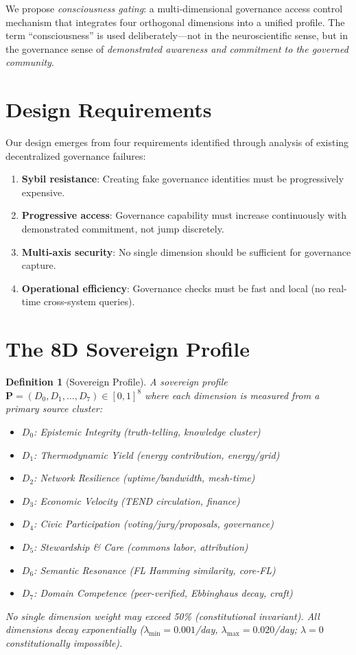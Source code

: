 \documentclass[11pt,twocolumn]{article}
\newtheorem{definition}{Definition}
\begin{document}
We propose \emph{consciousness gating}: a multi-dimensional governance
access control mechanism that integrates four orthogonal dimensions into
a unified profile. The term ``consciousness'' is used deliberately---not
in the neuroscientific sense, but in the governance sense of
\emph{demonstrated awareness and commitment to the governed community}.

\section{Design Requirements}

Our design emerges from four requirements identified through analysis of
existing decentralized governance failures:

\begin{enumerate}[label=\textbf{R\arabic*}]
  \item \textbf{Sybil resistance}: Creating fake governance identities must
    be progressively expensive.
  \item \textbf{Progressive access}: Governance capability must increase
    continuously with demonstrated commitment, not jump discretely.
  \item \textbf{Multi-axis security}: No single dimension should be
    sufficient for governance capture.
  \item \textbf{Operational efficiency}: Governance checks must be fast
    and local (no real-time cross-system queries).
\end{enumerate}

\section{The 8D Sovereign Profile}

\begin{definition}[Sovereign Profile]
A sovereign profile $\mathbf{P} = (D_0, D_1, \ldots, D_7) \in [0,1]^8$ where each dimension is measured from a primary source cluster:
\begin{itemize}[nosep]
  \item $D_0$: Epistemic Integrity (truth-telling, knowledge cluster)
  \item $D_1$: Thermodynamic Yield (energy contribution, energy/grid)
  \item $D_2$: Network Resilience (uptime/bandwidth, mesh-time)
  \item $D_3$: Economic Velocity (TEND circulation, finance)
  \item $D_4$: Civic Participation (voting/jury/proposals, governance)
  \item $D_5$: Stewardship \& Care (commons labor, attribution)
  \item $D_6$: Semantic Resonance (FL Hamming similarity, core-FL)
  \item $D_7$: Domain Competence (peer-verified, Ebbinghaus decay, craft)
\end{itemize}
No single dimension weight may exceed 50\% (constitutional invariant). All dimensions decay exponentially ($\lambda_{\min} = 0.001$/day, $\lambda_{\max} = 0.020$/day; $\lambda = 0$ constitutionally impossible).
\end{definition}
\end{document}
